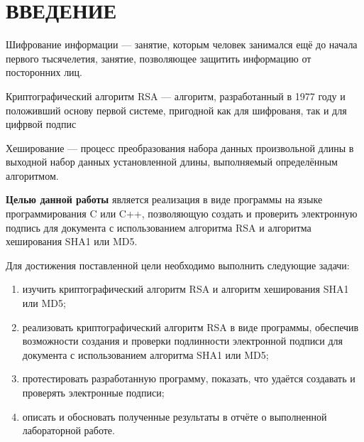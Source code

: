 \chapter*{ВВЕДЕНИЕ}

Шифрование информации --- занятие, которым человек занимался ещё до начала первого тысячелетия, занятие, позволяющее защитить информацию от посторонних лиц. 

Криптографический алгоритм RSA --- алгоритм, разработанный в 1977 году и положивший основу первой системе, пригодной как для шифрованя, так и для цифрвой подпис

Хеширование --- процесс преобразования набора данных произвольной длины в выходной набор данных установленной длины, выполняемый определённым алгоритмом.

\textbf{Целью данной работы} является реализация в виде программы на языке программирования C или C++, позволяющую создать и проверить электронную подпись для документа с использованием алгоритма RSA и алгоритма хеширования SHA1 или MD5.

Для достижения поставленной цели необходимо выполнить следующие задачи:
\begin{enumerate}[label=\arabic*)]
	\item изучить криптографический алгоритм RSA и алгоритм хеширования SHA1 или MD5;
	\item реализовать криптографический алгоритм RSA в виде программы, обеспечив возможности создания и проверки подлинности электронной подписи для документа с использованием алгоритма SHA1 или MD5;
	\item протестировать разработанную программу, показать, что удаётся создавать и проверять электронные подписи;
	\item описать и обосновать полученные результаты в отчёте о выполненной лабораторной работе.
\end{enumerate}
